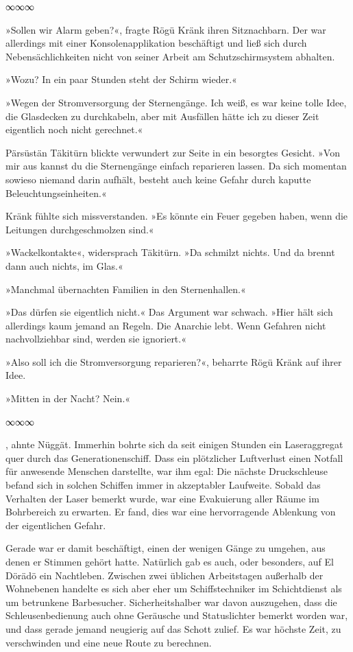 \begin{center}
	∞∞∞
\end{center}

»Sollen wir Alarm geben?«, fragte Rögü Kränk ihren Sitznachbarn. Der war allerdings mit einer Konsolenapplikation beschäftigt und ließ sich durch Nebensächlichkeiten nicht von seiner Arbeit am Schutzschirmsystem abhalten.

»Wozu? In ein paar Stunden steht der Schirm wieder.«

»Wegen der Stromversorgung der Sternengänge. Ich weiß, es war keine tolle Idee, die Glasdecken zu durchkabeln, aber mit Ausfällen hätte ich zu dieser Zeit eigentlich noch nicht gerechnet.«

Pärsüstän Täkitürn blickte verwundert zur Seite in ein besorgtes Gesicht. »Von mir aus kannst du die Sternengänge einfach reparieren lassen. Da sich momentan sowieso niemand darin aufhält, besteht auch keine Gefahr durch kaputte Beleuchtungseinheiten.«

Kränk fühlte sich missverstanden. »Es könnte ein Feuer gegeben haben, wenn die Leitungen durchgeschmolzen sind.«

»Wackelkontakte«, widersprach Täkitürn. »Da schmilzt nichts. Und da brennt dann auch nichts, im Glas.«

»Manchmal übernachten Familien in den Sternenhallen.«

»Das dürfen sie eigentlich nicht.« Das Argument war schwach. »Hier hält sich allerdings kaum jemand an Regeln. Die Anarchie lebt. Wenn Gefahren nicht nachvollziehbar sind, werden sie ignoriert.«

»Also soll ich die Stromversorgung reparieren?«, beharrte Rögü Kränk auf ihrer Idee.

»Mitten in der Nacht? Nein.«

\begin{center}
	∞∞∞
\end{center}

, ahnte Nüggät. Immerhin bohrte sich da seit einigen Stunden ein Laseraggregat quer durch das Generationenschiff. Dass ein plötzlicher Luftverlust einen Notfall für anwesende Menschen darstellte, war ihm egal: Die nächste Druckschleuse befand sich in solchen Schiffen immer in akzeptabler Laufweite. Sobald das Verhalten der Laser bemerkt wurde, war eine Evakuierung aller Räume im Bohrbereich zu erwarten. Er fand, dies war eine hervorragende Ablenkung von der eigentlichen Gefahr.

Gerade war er damit beschäftigt, einen der wenigen Gänge zu umgehen, aus denen er Stimmen gehört hatte. Natürlich gab es auch, oder besonders, auf El Dörädö ein Nachtleben. Zwischen zwei üblichen Arbeitstagen außerhalb der Wohnebenen handelte es sich aber eher um Schiffstechniker im Schichtdienst als um betrunkene Barbesucher. Sicherheitshalber war davon auszugehen, dass die Schleusenbedienung auch ohne Geräusche und Statuslichter bemerkt worden war, und dass gerade jemand neugierig auf das Schott zulief. Es war höchste Zeit, zu verschwinden und eine neue Route zu berechnen.

